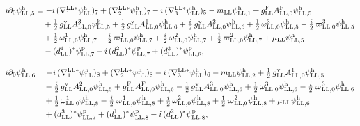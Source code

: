 \documentclass[
  10pt,
]{article}
\begin{document}
\[\begin{aligned}
i\partial_0\psi^{\rm h}_{{\rm LL},5}&=-i\,(\nabla^{{\rm LL}*}_1\psi^{\rm h}_{\rm LL})_7+(\nabla^{{\rm LL}*}_2\psi^{\rm h}_{\rm LL})_7-i\,(\nabla^{{\rm LL}*}_3\psi^{\rm h}_{\rm LL})_5-m_{\rm LL}\psi^{\rm h}_{{\rm LL},1}+g^{\rm F}_{\rm LL}A^{\rm F}_{{\rm LL},0}\psi^{\rm h}_{{\rm LL},5}\\
&\quad +\tfrac{1}{2}\,g^{\rm v}_{\rm LL}A^{3}_{{\rm LL},0}\psi^{\rm h}_{{\rm LL},5}+\tfrac{1}{2}\,g^{\rm v}_{\rm LL}A^{1}_{{\rm LL},0}\psi^{\rm h}_{{\rm LL},6}+\tfrac{i}{2}\,g^{\rm v}_{\rm LL}A^{2}_{{\rm LL},0}\psi^{\rm h}_{{\rm LL},6}+\tfrac{1}{2}\,\omega^{3}_{{\rm LL},0}\psi^{\rm h}_{{\rm LL},5}-\tfrac{i}{2}\,\varpi^{3}_{{\rm LL},0}\psi^{\rm h}_{{\rm LL},5}\\
&\quad +\tfrac{1}{2}\,\omega^{1}_{{\rm LL},0}\psi^{\rm h}_{{\rm LL},7}-\tfrac{i}{2}\,\varpi^{1}_{{\rm LL},0}\psi^{\rm h}_{{\rm LL},7}+\tfrac{i}{2}\,\omega^{2}_{{\rm LL},0}\psi^{\rm h}_{{\rm LL},7}+\tfrac{1}{2}\,\varpi^{2}_{{\rm LL},0}\psi^{\rm h}_{{\rm LL},7}+\mu_{\rm LL}\psi^{\rm h}_{{\rm LL},5}\\
&\quad -(d^{1}_{\rm LL})^*\psi^{\rm p}_{{\rm LL},7}-i\,(d^{2}_{\rm LL})^*\psi^{\rm p}_{{\rm LL},7}+(d^{3}_{\rm LL})^*\psi^{\rm p}_{{\rm LL},8},
\end{aligned}\]

\[\begin{aligned}
i\partial_0\psi^{\rm h}_{{\rm LL},6}&=-i\,(\nabla^{{\rm LL}*}_1\psi^{\rm h}_{\rm LL})_8+(\nabla^{{\rm LL}*}_2\psi^{\rm h}_{\rm LL})_8-i\,(\nabla^{{\rm LL}*}_3\psi^{\rm h}_{\rm LL})_6-m_{\rm LL}\psi^{\rm h}_{{\rm LL},2}+\tfrac{1}{2}\,g^{\rm v}_{\rm LL}A^{1}_{{\rm LL},0}\psi^{\rm h}_{{\rm LL},5}\\
&\quad -\tfrac{i}{2}\,g^{\rm v}_{\rm LL}A^{2}_{{\rm LL},0}\psi^{\rm h}_{{\rm LL},5}+g^{\rm F}_{\rm LL}A^{\rm F}_{{\rm LL},0}\psi^{\rm h}_{{\rm LL},6}-\tfrac{1}{2}\,g^{\rm v}_{\rm LL}A^{3}_{{\rm LL},0}\psi^{\rm h}_{{\rm LL},6}+\tfrac{1}{2}\,\omega^{3}_{{\rm LL},0}\psi^{\rm h}_{{\rm LL},6}-\tfrac{i}{2}\,\varpi^{3}_{{\rm LL},0}\psi^{\rm h}_{{\rm LL},6}\\
&\quad +\tfrac{1}{2}\,\omega^{1}_{{\rm LL},0}\psi^{\rm h}_{{\rm LL},8}-\tfrac{i}{2}\,\varpi^{1}_{{\rm LL},0}\psi^{\rm h}_{{\rm LL},8}+\tfrac{i}{2}\,\omega^{2}_{{\rm LL},0}\psi^{\rm h}_{{\rm LL},8}+\tfrac{1}{2}\,\varpi^{2}_{{\rm LL},0}\psi^{\rm h}_{{\rm LL},8}+\mu_{\rm LL}\psi^{\rm h}_{{\rm LL},6}\\
&\quad +(d^{3}_{\rm LL})^*\psi^{\rm p}_{{\rm LL},7}+(d^{1}_{\rm LL})^*\psi^{\rm p}_{{\rm LL},8}-i\,(d^{2}_{\rm LL})^*\psi^{\rm p}_{{\rm LL},8},
\end{aligned}\]
\end{document}
